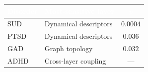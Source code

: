 \documentclass[border=10pt]{standalone}
\begin{document}
{\sffamily\fontsize{20}{26}\selectfont
\setlength{\arrayrulewidth}{1pt}\renewcommand{\arraystretch}{1.5}
\begin{tabular}{l l c}
\toprule
\rowcolor{sbnavy}\textbf{\textcolor{white}{Disorder}} & \textbf{\textcolor{white}{Most-sensitive layer}} & \textbf{\textcolor{white}{$p$}}\\
\midrule
\rowcolor{sbaccent!22}SUD  & Dynamical descriptors & $\mathbf{0.0004}$\\
PTSD & Dynamical descriptors & $0.036$\\
GAD  & Graph topology        & $0.032$\\
ADHD & Cross-layer coupling  & ---\\
\bottomrule
\end{tabular}}
\end{document}
